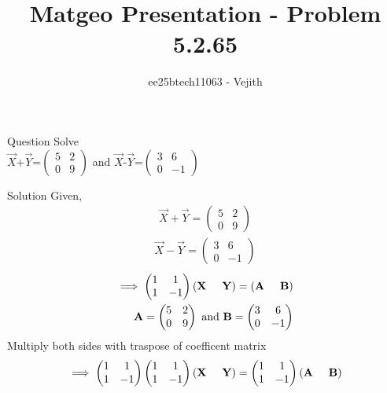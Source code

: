 \documentclass{beamer}
\title{Matgeo Presentation - Problem 5.2.65}
\author{ee25btech11063 - Vejith}
\numberwithin{equation}{section}
\providecommand{\brak}[1]{\ensuremath{\left(#1\right)}}
\theoremstyle{remark}
\let\vec\mathbf
\begin{document}
\frame{\titlepage}
\begin{frame}{Question}
Solve\\
$\Vec{X}$+$\Vec{Y}$=$\begin{pmatrix}
    5 & 2\\
    0 & 9
\end{pmatrix}$ and $\Vec{X}$-$\Vec{Y}$=$\begin{pmatrix}
    3 & 6\\
    0 & -1
\end{pmatrix}$
\end{frame}

\begin{frame}{Solution}
Given,
\begin{align}
    \Vec{X}+\Vec{Y}=\begin{pmatrix}
    5 & 2\\
    0 & 9
    \end{pmatrix}
\end{align}
\begin{align}
    \Vec{X}-\Vec{Y}=\begin{pmatrix}
    3 & 6\\
    0 & -1
\end{pmatrix}
\end{align}
\begin{align}
    \implies \begin{pmatrix}
        1 & 1\\
         1 & -1
    \end{pmatrix} \brak{\vec{X}\hspace{0.5cm}\vec{Y}}=\brak{\vec{A}\hspace{0.5cm}\vec{B}}\\
     \vec{A}= \begin{pmatrix}
    5 & 2\\
    0 & 9
\end{pmatrix} \text{ and } \vec{B}=\begin{pmatrix}
    3 & 6\\
    0 & -1
\end{pmatrix}
    \end{align}
Multiply both sides with traspose of coefficent matrix
\begin{align}
    \implies \begin{pmatrix}
        1 & 1\\
         1 & -1
    \end{pmatrix} \begin{pmatrix}
        1 & 1\\
         1 & -1
    \end{pmatrix} \brak{\vec{X}\hspace{0.5cm}\vec{Y}}=\begin{pmatrix}
        1 & 1\\
         1 & -1
    \end{pmatrix} \brak{\vec{A}\hspace{0.5cm}\vec{B}}
     \end{align}
    \end{frame}
\end{document}
